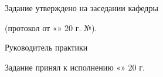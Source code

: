 \vspace{1.5em}

\noindent Задание утверждено на заседании кафедры \underline{\hspace{7cm}}

\noindent (протокол от «\underline{\hspace{0.8cm}}» \underline{\hspace{3cm}} 20\underline{\hspace{0.5cm}} г. №\underline{\hspace{1cm}}).

\vspace{1em}

\noindent Руководитель практики \hfill \underline{\hspace{3cm}} \hfill \SupervisorName

\vspace{1.5em}

\noindent Задание принял к исполнению «\underline{\hspace{0.8cm}}» \underline{\hspace{3cm}} 20\underline{\hspace{0.5cm}} г.

\vspace{1.5em}

\noindent\hfill \underline{\hspace{4cm}} \hfill \StudentName
